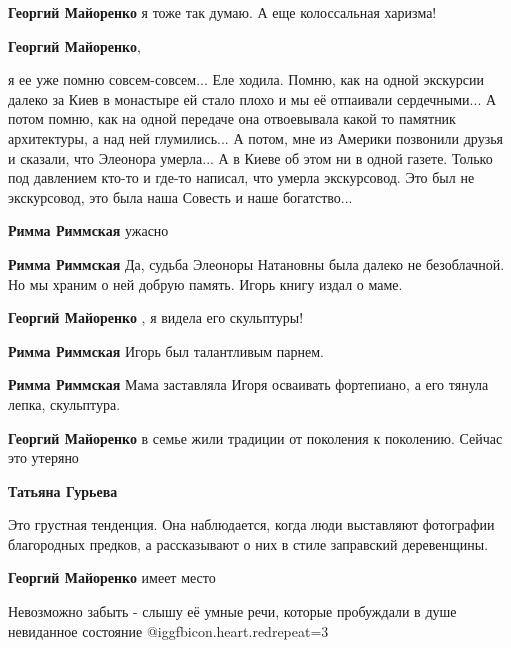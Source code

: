 \begin{itemize} %
\textbf{Георгий Майоренко} я тоже так думаю. А еще колоссальная харизма!

\textbf{Георгий Майоренко}, 

я ее уже помню совсем-совсем... Еле ходила. Помню, как на одной экскурсии
далеко за Киев в монастыре ей стало плохо и мы её отпаивали сердечными... А
потом помню, как на одной передаче она отвоевывала какой то памятник
архитектуры, а над ней глумились... А потом, мне из Америки позвонили друзья и
сказали, что Элеонора умерла... А в Киеве об этом ни в одной газете. Только под
давлением кто-то и где-то написал, что умерла экскурсовод. Это был не
экскурсовод, это была наша Совесть и наше богатство...

\begin{itemize} %
\textbf{Римма Риммская} ужасно

\textbf{Римма Риммская} Да, судьба Элеоноры Натановны была далеко не безоблачной. Но мы храним о ней добрую память. Игорь книгу издал о маме.

\textbf{Георгий Майоренко} , я видела его скульптуры!

\textbf{Римма Риммская} Игорь был талантливым парнем.

\textbf{Римма Риммская} Мама заставляла Игоря осваивать фортепиано, а его тянула лепка, скульптура.

\textbf{Георгий Майоренко} в семье жили традиции от поколения к поколению. Сейчас это утеряно

\textbf{Татьяна Гурьева} 

Это грустная тенденция. Она наблюдается, когда люди выставляют
фотографии благородных предков, а рассказывают о них в стиле
заправский деревенщины.

\end{itemize} %

\textbf{Георгий Майоренко} имеет место

\end{itemize} %


Невозможно забыть - слышу её умные речи, которые пробуждали в душе невиданное
состояние @igg{fbicon.heart.red}{repeat=3}

